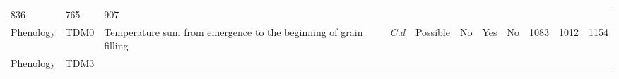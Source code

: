 \documentclass[a4paper]{article}
\begin{document}
\begin{longtable}[]{@{}llllccccrrr@{}}
\begin{minipage}[t]{0.04\columnwidth}
836\strut
\end{minipage} & \begin{minipage}[t]{0.04\columnwidth}\raggedleft\strut
765\strut
\end{minipage} & \begin{minipage}[t]{0.04\columnwidth}\raggedleft\strut
907\strut
\end{minipage}\tabularnewline
\begin{minipage}[t]{0.08\columnwidth}\raggedright\strut
Phenology\strut
\end{minipage} & \begin{minipage}[t]{0.05\columnwidth}\raggedright\strut
TDM0\strut
\end{minipage} & \begin{minipage}[t]{0.19\columnwidth}\raggedright\strut
Temperature sum from emergence to the beginning of grain filling\strut
\end{minipage} & \begin{minipage}[t]{0.06\columnwidth}\raggedright\strut
\(C.d\)\strut
\end{minipage} & \begin{minipage}[t]{0.06\columnwidth}\centering\strut
Possible\strut
\end{minipage} & \begin{minipage}[t]{0.08\columnwidth}\centering\strut
No\strut
\end{minipage} & \begin{minipage}[t]{0.05\columnwidth}\centering\strut
Yes\strut
\end{minipage} & \begin{minipage}[t]{0.04\columnwidth}\centering\strut
No\strut
\end{minipage} & \begin{minipage}[t]{0.04\columnwidth}\raggedleft\strut
1083\strut
\end{minipage} & \begin{minipage}[t]{0.04\columnwidth}\raggedleft\strut
1012\strut
\end{minipage} & \begin{minipage}[t]{0.04\columnwidth}\raggedleft\strut
1154\strut
\end{minipage}\tabularnewline
\begin{minipage}[t]{0.08\columnwidth}\raggedright\strut
Phenology\strut
\end{minipage} & \begin{minipage}[t]{0.05\columnwidth}\raggedright\strut
TDM3\strut
\end{minipage} & \begin{minipage}[t]{0.19\columnwidth}\raggedright\strut

\end{minipage}
\end{longtable}
\end{document}
